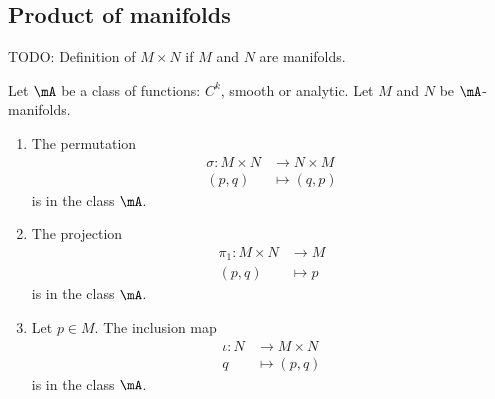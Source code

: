 \subsection{Product of manifolds}

\begin{definition}      \label{DEFooYOLXooDPrnHa}
	TODO: Definition of \( M\times N\) if \( M\) and \( N\) are manifolds.
\end{definition}


\begin{proposition}      \label{PROPooCHVLooVFScOl}
	Let \( \mA\) be a class of functions: \( C^k\), smooth or analytic.  Let \( M\) and \( N\) be \( \mA\)-manifolds.
	\begin{enumerate}
		\item
		      The permutation
		      \begin{equation}
			      \begin{aligned}
				      \sigma\colon M\times N & \to N\times M \\
				      (p,q)                  & \mapsto (q,p)
			      \end{aligned}
		      \end{equation}
		      is in the class \( \mA\).
		\item       \label{ITEMooRFFAooRSeBPl}
		      The projection
		      \begin{equation}
			      \begin{aligned}
				      \pi_1\colon M\times N & \to M     \\
				      (p,q)                 & \mapsto p
			      \end{aligned}
		      \end{equation}
		      is in the class \( \mA\).
		\item
		      Let \( p\in M\). The inclusion map
		      \begin{equation}
			      \begin{aligned}
				      \iota\colon N & \to M\times N \\
				      q             & \mapsto (p,q)
			      \end{aligned}
		      \end{equation}
		      is in the class \( \mA\).
	\end{enumerate}
\end{proposition}

